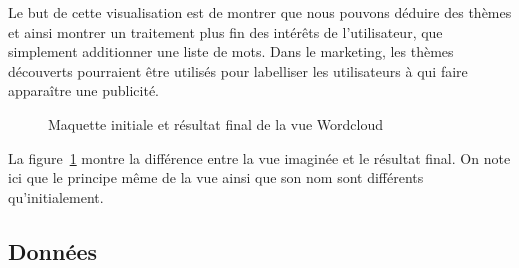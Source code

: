 		Le but de cette visualisation est de montrer que nous pouvons déduire des thèmes et ainsi montrer un traitement plus fin des intérêts de l'utilisateur, que simplement additionner une liste de mots. Dans le marketing, les thèmes découverts pourraient être utilisés pour labelliser les utilisateurs à qui faire apparaître une publicité.

		\begin{figure}[!h]
			\centering
			\caption{Maquette initiale et résultat final de la vue Wordcloud}
			\label{topics_images}
		\end{figure}

		La figure~\ref{topics_images} montre la différence entre la vue imaginée et le résultat final. On note ici que le principe même de la vue ainsi que son nom sont différents qu'initialement.

	\subsection{Données}

